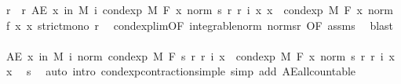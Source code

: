 \begin{isabellebody}
\ r{\isacharprime}{\kern0pt}\ \ r{\isacharprime}{\kern0pt}{\isacharcolon}{\kern0pt}\ {\isachardoublequoteopen}AE\ x\ in\ M{\isachardot}{\kern0pt}\ {\isacharparenleft}{\kern0pt}{\isasymlambda}i{\isachardot}{\kern0pt}\ {\isacharparenleft}{\kern0pt}cond{\isacharunderscore}{\kern0pt}exp\ M\ F\ {\isacharparenleft}{\kern0pt}{\isasymlambda}x{\isachardot}{\kern0pt}\ norm\ {\isacharparenleft}{\kern0pt}s\ {\isacharparenleft}{\kern0pt}r\ {\isacharparenleft}{\kern0pt}r{\isacharprime}{\kern0pt}\ i{\isacharparenright}{\kern0pt}{\isacharparenright}{\kern0pt}\ x{\isacharparenright}{\kern0pt}{\isacharparenright}{\kern0pt}\ x{\isacharparenright}{\kern0pt}{\isacharparenright}{\kern0pt}\ {\isasymlonglonglongrightarrow}\ cond{\isacharunderscore}{\kern0pt}exp\ M\ F\ {\isacharparenleft}{\kern0pt}{\isasymlambda}x{\isachardot}{\kern0pt}\ norm\ {\isacharparenleft}{\kern0pt}f\ x{\isacharparenright}{\kern0pt}{\isacharparenright}{\kern0pt}\ x{\isachardoublequoteclose}\ {\isachardoublequoteopen}strict{\isacharunderscore}{\kern0pt}mono\ r{\isacharprime}{\kern0pt}{\isachardoublequoteclose}\ \isamarkupfalse%
\ cond{\isacharunderscore}{\kern0pt}exp{\isacharunderscore}{\kern0pt}lim{\isacharbrackleft}{\kern0pt}OF\ integrable{\isacharunderscore}{\kern0pt}norm\ norm{\isacharunderscore}{\kern0pt}s{\isacharunderscore}{\kern0pt}r{\isacharcomma}{\kern0pt}\ OF\ assms{\isacharbrackright}{\kern0pt}\ \isamarkupfalse%
\ blast\isanewline
\isanewline
\ \ \isamarkupfalse%
\ {\isachardoublequoteopen}AE\ x\ in\ M{\isachardot}{\kern0pt}\ {\isasymforall}i{\isachardot}{\kern0pt}\ norm\ {\isacharparenleft}{\kern0pt}cond{\isacharunderscore}{\kern0pt}exp\ M\ F\ {\isacharparenleft}{\kern0pt}s\ {\isacharparenleft}{\kern0pt}r\ {\isacharparenleft}{\kern0pt}r{\isacharprime}{\kern0pt}\ i{\isacharparenright}{\kern0pt}{\isacharparenright}{\kern0pt}{\isacharparenright}{\kern0pt}\ x{\isacharparenright}{\kern0pt}\ {\isasymle}\ cond{\isacharunderscore}{\kern0pt}exp\ M\ F\ {\isacharparenleft}{\kern0pt}{\isasymlambda}x{\isachardot}{\kern0pt}\ norm\ {\isacharparenleft}{\kern0pt}s\ {\isacharparenleft}{\kern0pt}r\ {\isacharparenleft}{\kern0pt}r{\isacharprime}{\kern0pt}\ i{\isacharparenright}{\kern0pt}{\isacharparenright}{\kern0pt}\ x{\isacharparenright}{\kern0pt}{\isacharparenright}{\kern0pt}\ x{\isachardoublequoteclose}\ \isamarkupfalse%
\ s\ \isamarkupfalse%
\ {\isacharparenleft}{\kern0pt}auto\ intro{\isacharcolon}{\kern0pt}\ cond{\isacharunderscore}{\kern0pt}exp{\isacharunderscore}{\kern0pt}contraction{\isacharunderscore}{\kern0pt}simple\ simp\ add{\isacharcolon}{\kern0pt}\ AE{\isacharunderscore}{\kern0pt}all{\isacharunderscore}{\kern0pt}countable{\isacharparenright}{\kern0pt}\isanewline

\end{isabellebody}
